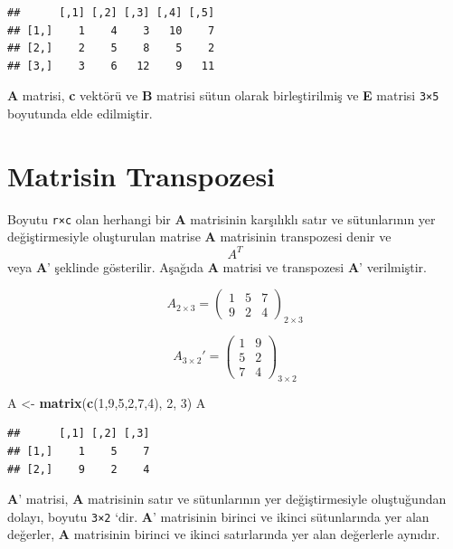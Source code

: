 \documentclass[
]{book}
\newenvironment{Shaded}{\begin{snugshade}}{\end{snugshade}}
\newcommand{\DecValTok}[1]{\textcolor[rgb]{0.00,0.00,0.81}{#1}}
\newcommand{\FunctionTok}[1]{\textcolor[rgb]{0.13,0.29,0.53}{\textbf{#1}}}
\newcommand{\NormalTok}[1]{#1}
\newcommand{\OtherTok}[1]{\textcolor[rgb]{0.56,0.35,0.01}{#1}}
\begin{document}
\begin{verbatim}
##      [,1] [,2] [,3] [,4] [,5]
## [1,]    1    4    3   10    7
## [2,]    2    5    8    5    2
## [3,]    3    6   12    9   11
\end{verbatim}

\textbf{A} matrisi, \textbf{c} vektörü ve \textbf{B} matrisi sütun olarak birleştirilmiş ve \textbf{E} matrisi \texttt{3×5} boyutunda elde edilmiştir.

\section{Matrisin Transpozesi}\label{matrisin-transpozesi}

Boyutu \texttt{r×c} olan herhangi bir \textbf{A} matrisinin karşılıklı satır ve sütunlarının yer değiştirmesiyle oluşturulan matrise \textbf{A} matrisinin transpozesi denir ve \[A^{T}\] veya \textbf{A}' şeklinde gösterilir. Aşağıda \textbf{A} matrisi ve transpozesi \textbf{A}' verilmiştir.

\[A_{2×3} =
\begin{pmatrix}
 1 & 5 & 7 \\
 9 & 2 & 4
\end{pmatrix}_{2×3}\]

\[A_{3×2}' =
\begin{pmatrix}
 1 & 9 \\
 5 & 2 \\
 7 & 4
\end{pmatrix}_{3×2}\]

\begin{Shaded}
\begin{Highlighting}[]
\NormalTok{ A }\OtherTok{\textless{}{-}} \FunctionTok{matrix}\NormalTok{(}\FunctionTok{c}\NormalTok{(}\DecValTok{1}\NormalTok{,}\DecValTok{9}\NormalTok{,}\DecValTok{5}\NormalTok{,}\DecValTok{2}\NormalTok{,}\DecValTok{7}\NormalTok{,}\DecValTok{4}\NormalTok{), }\DecValTok{2}\NormalTok{, }\DecValTok{3}\NormalTok{) }
\NormalTok{ A }
\end{Highlighting}
\end{Shaded}

\begin{verbatim}
##      [,1] [,2] [,3]
## [1,]    1    5    7
## [2,]    9    2    4
\end{verbatim}

\textbf{A}' matrisi, \textbf{A} matrisinin satır ve sütunlarının yer değiştirmesiyle oluştuğundan dolayı, boyutu \texttt{3×2} `dir. \textbf{A}' matrisinin birinci ve ikinci sütunlarında yer alan değerler, \textbf{A} matrisinin birinci ve ikinci satırlarında yer alan değerlerle aynıdır.
\end{document}
